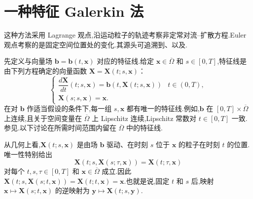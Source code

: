 \section{一种特征 Galerkin 法}\label{sec:12.5}

这种方法采用 Lagrange 观点,沿运动粒子的轨迹考察非定常对流--扩散方程.Euler 观点考察的是固定空间位置处的变化.其源头可追溯到、以及.

先定义与向量场 \(\boldsymbol{b}=\boldsymbol{b}(t,\boldsymbol{x})\) 对应的特征线.给定 \(\boldsymbol{x}\in\overline\Omega\) 和 \(s\in[0,T]\),特征线是由下列方程确定的向量函数 \(\boldsymbol{X}=\boldsymbol{X}(t;s,\boldsymbol{x})\)：
\begin{equation}\label{eq:12.5.1}
  \begin{cases}
    \dfrac{d\boldsymbol{X}}{dt}(t;s,\boldsymbol{x})=\boldsymbol{b}(t,\boldsymbol{X}(t;s,\boldsymbol{x}))
       & t\in(0,T),\\[2pt]
    \boldsymbol{X}(s;s,\boldsymbol{x})=\boldsymbol{x}.
  \end{cases}
\end{equation}
在对 \(\boldsymbol{b}\) 作适当假设的条件下,每一组 \(s,\boldsymbol{x}\) 都有唯一的特征线.例如,\(\boldsymbol{b}\) 在 \([0,T]\times\overline\Omega\) 上连续,且关于空间变量在 \(\overline\Omega\) 上 Lipschitz 连续,Lipschitz 常数对 \(t\in[0,T]\) 一致.参见.以下讨论在所需时间范围内留在 \(\overline\Omega\) 中的特征线.

从几何上看,\(\boldsymbol{X}(t;s,\boldsymbol{x})\) 是由场 \(\boldsymbol{b}\) 驱动、在时刻 \(s\) 位于 \(\boldsymbol{x}\) 的粒子在时刻 \(t\) 的位置.唯一性特别给出
\begin{equation}\label{eq:12.5.2}
  \boldsymbol{X}(t;s,\boldsymbol{X}(s;\tau,\boldsymbol{x}))=\boldsymbol{X}(t;\tau,\boldsymbol{x})
\end{equation}
对每个 \(t,s,\tau\in[0,T]\) 和 \(\boldsymbol{x}\in\overline\Omega\) 成立.因此 \(\boldsymbol{X}(t;s,\boldsymbol{X}(s;t,\boldsymbol{x}))=\boldsymbol{X}(t;t,\boldsymbol{x})=\boldsymbol{x}\).也就是说,固定 \(t\) 和 \(s\) 后,映射 \(\boldsymbol{x}\mapsto\boldsymbol{X}(s;t,\boldsymbol{x})\) 的逆映射为 \(\boldsymbol{y}\mapsto\boldsymbol{X}(t;s,\boldsymbol{y})\).

